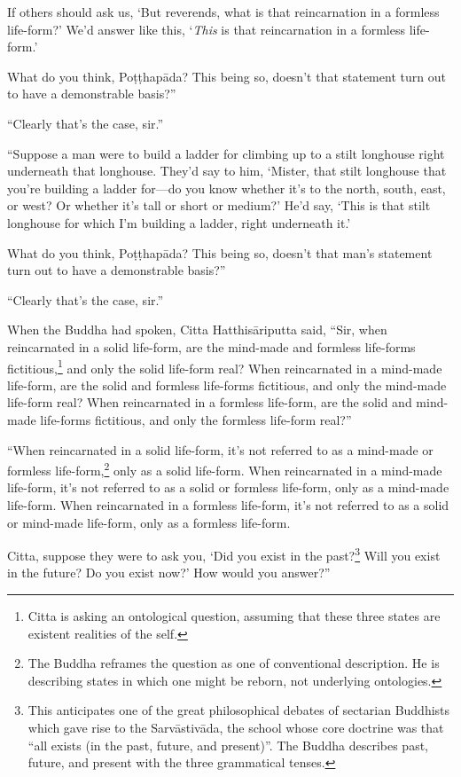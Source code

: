 \documentclass[12pt,openany]{book}%
\begin{document}
If others should ask us, ‘But reverends, what is that reincarnation in a formless life-form?’ We’d answer like this, ‘\emph{This} is that reincarnation in a formless life-form.’ 

What do you think, \textsanskrit{Poṭṭhapāda}? This being so, doesn’t that statement turn out to have a demonstrable basis?” 

“Clearly that’s the case, sir.” 

“Suppose a man were to build a ladder for climbing up to a stilt longhouse right underneath that longhouse. They’d say to him, ‘Mister, that stilt longhouse that you’re building a ladder for—do you know whether it’s to the north, south, east, or west? Or whether it’s tall or short or medium?’ He’d say, ‘This is that stilt longhouse for which I’m building a ladder, right underneath it.’ 

What do you think, \textsanskrit{Poṭṭhapāda}? This being so, doesn’t that man’s statement turn out to have a demonstrable basis?” 

“Clearly that’s the case, sir.” 

When the Buddha had spoken, Citta \textsanskrit{Hatthisāriputta} said, “Sir, when reincarnated in a solid life-form, are the mind-made and formless life-forms fictitious,\footnote{Citta is asking an ontological question, assuming that these three states are existent realities of the self. } and only the solid life-form real? When reincarnated in a mind-made life-form, are the solid and formless life-forms fictitious, and only the mind-made life-form real? When reincarnated in a formless life-form, are the solid and mind-made life-forms fictitious, and only the formless life-form real?” 

“When reincarnated in a solid life-form, it’s not referred to as a mind-made or formless life-form,\footnote{The Buddha reframes the question as one of conventional description. He is describing states in which one might be reborn, not underlying ontologies. } only as a solid life-form. When reincarnated in a mind-made life-form, it’s not referred to as a solid or formless life-form, only as a mind-made life-form. When reincarnated in a formless life-form, it’s not referred to as a solid or mind-made life-form, only as a formless life-form. 

Citta, suppose they were to ask you, ‘Did you exist in the past?\footnote{This anticipates one of the great philosophical debates of sectarian Buddhists which gave rise to the \textsanskrit{Sarvāstivāda}, the school whose core doctrine was that “all exists (in the past, future, and present)”. The Buddha describes past, future, and present with the three grammatical tenses. } Will you exist in the future? Do you exist now?’ How would you answer?” 
\end{document}
